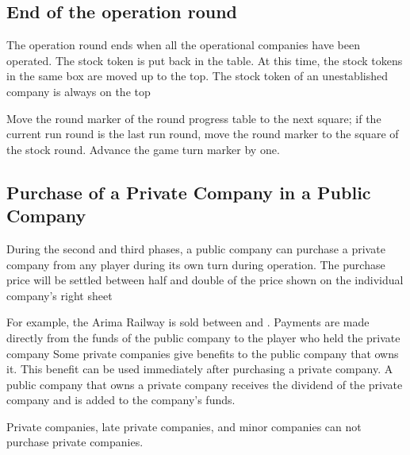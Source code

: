\documentclass{article}
\begin{document}
\begin{CJK}{UTF8}{min}
\subsection{End of the operation round}
The operation round ends when all the operational companies have been
operated. The stock token is put back in the table. At this time, the
stock tokens in the same box are moved up to the top. The stock token
of an unestablished company is always on the top

Move the round marker of the round progress table to the next square;
if the current run round is the last run round, move the round marker
to the square of the stock round. Advance the game turn marker by one.

\subsection{Purchase of a Private Company in a Public Company}
During the second and third phases, a public company can purchase a
private company from any player during its own turn during
operation. The purchase price will be settled between half and double
of the price shown on the individual company's right sheet

For example, the  Arima Railway is sold between  and
. Payments are made directly from the funds of the public
company to the player who held the private company Some private
companies give benefits to the public company that owns it. This
benefit can be used immediately after purchasing a private company. A
public company that owns a private company receives the dividend of
the private company and is added to the company's funds.

Private companies, late private companies, and minor companies can
not purchase private companies.






\end{CJK}
\end{document}
